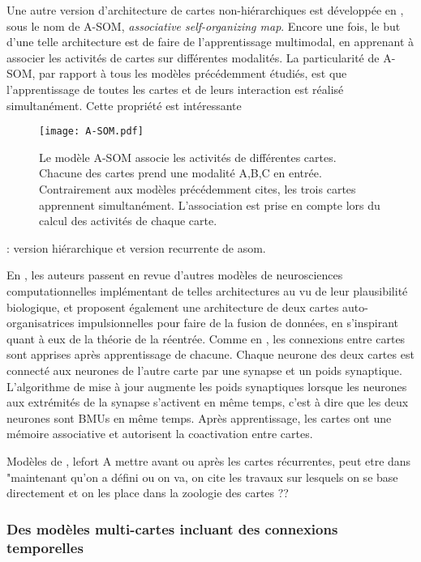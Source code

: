 \documentclass[../main]{subfiles}
\begin{document}
Une autre version d'architecture de cartes non-hiérarchiques est développée en \cite{johnsson_associating_2008,johnsson_associative_2009}, sous le nom de A-SOM, \emph{associative self-organizing map}. Encore une fois, le but d'une telle architecture est de faire de l'apprentissage multimodal, en apprenant à associer les activités de cartes sur différentes modalités.
La particularité de A-SOM, par rapport à tous les modèles précédemment étudiés, est que l'apprentissage de toutes les cartes et de leurs interaction est réalisé simultanément. 
Cette propriété est intéressante
\begin{figure}
    \centering\texttt{[image: A-SOM.pdf]}
    \caption{Le modèle A-SOM \cite{johnsson_associative_2009} associe les activités de différentes cartes. Chacune des cartes prend une modalité A,B,C en entrée. Contrairement aux modèles précédemment cites, les trois cartes apprennent simultanément. L'association est prise en compte lors du calcul des activités de chaque carte.\label{fig:asom}}
\end{figure}
\cite{buonamente_hierarchies_2016,Buonamente2013SimulatingAW}: version hiérarchique et version recurrente de asom.

En \cite{khacef_brain-inspired_2020}, les auteurs passent en revue d'autres modèles de neurosciences computationnelles implémentant de telles architectures au vu de leur plausibilité biologique, et proposent également une architecture de deux cartes auto-organisatrices impulsionnelles pour faire de la fusion de données, en s'inspirant quant à eux de la théorie de la réentrée. Comme en \cite{dominey13}, les connexions entre cartes sont apprises après apprentissage de chacune. Chaque neurone des deux cartes est connecté aux neurones de l'autre carte par une synapse et un poids synaptique. L'algorithme de mise à jour augmente les poids synaptiques lorsque les neurones aux extrémités de la synapse s'activent en même temps, c'est à dire que les deux neurones sont BMUs en même temps. Après apprentissage, les cartes ont une mémoire associative et autorisent la coactivation entre cartes.

Modèles de \cite{khouzam,menard05}, lefort
A mettre avant ou après les cartes récurrentes, peut etre dans "maintenant qu'on a défini ou on va, on cite les travaux sur lesquels on se base directement et on les place dans la zoologie des cartes ??

\subsubsection{Des modèles multi-cartes incluant des connexions temporelles}
\end{document}

